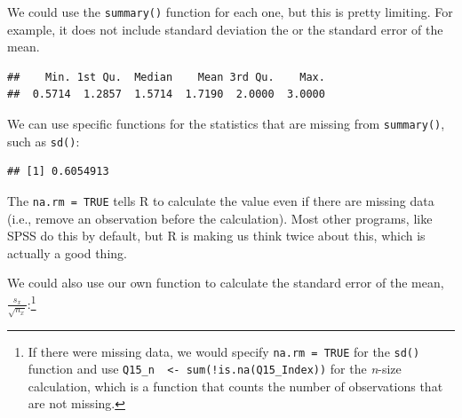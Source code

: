 \documentclass[
]{article}
\newenvironment{Shaded}{\begin{snugshade}}{\end{snugshade}}
\newcommand{\DataTypeTok}[1]{\textcolor[rgb]{0.13,0.29,0.53}{#1}}
\newcommand{\KeywordTok}[1]{\textcolor[rgb]{0.13,0.29,0.53}{\textbf{#1}}}
\newcommand{\NormalTok}[1]{#1}
\newcommand{\OperatorTok}[1]{\textcolor[rgb]{0.81,0.36,0.00}{\textbf{#1}}}
\newcommand{\OtherTok}[1]{\textcolor[rgb]{0.56,0.35,0.01}{#1}}
\newcommand{\StringTok}[1]{\textcolor[rgb]{0.31,0.60,0.02}{#1}}
\begin{document}
We could use the \texttt{summary()} function for each one, but this is pretty limiting. For example, it does not include standard deviation the or the standard error of the mean.

\begin{Shaded}
\end{Shaded}

\begin{verbatim}
##    Min. 1st Qu.  Median    Mean 3rd Qu.    Max. 
##  0.5714  1.2857  1.5714  1.7190  2.0000  3.0000
\end{verbatim}

We can use specific functions for the statistics that are missing from \texttt{summary()}, such as \texttt{sd()}:

\begin{Shaded}
\end{Shaded}

\begin{verbatim}
## [1] 0.6054913
\end{verbatim}

The \texttt{na.rm\ =\ TRUE} tells R to calculate the value even if there are missing data (i.e., remove an observation before the calculation). Most other programs, like SPSS do this by default, but R is making us think twice about this, which is actually a good thing.

We could also use our own function to calculate the standard error of the mean, \(\frac{s_x}{\sqrt{n_x}}\):\footnote{If there were missing data, we would specify \texttt{na.rm\ =\ TRUE} for the \texttt{sd()} function and use \texttt{Q15\_n\ \ \textless{}-\ sum(!is.na(Q15\_Index))} for the \emph{n}-size calculation, which is a function that counts the number of observations that are not missing.}

\begin{Shaded}
\end{Shaded}
\end{document}
